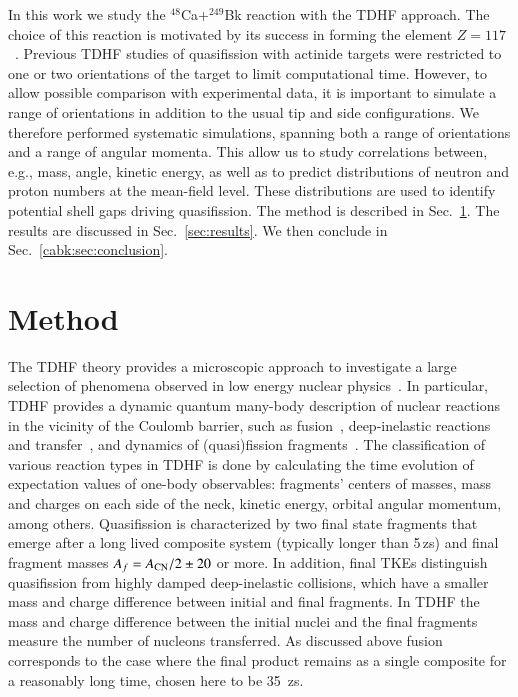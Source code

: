 In this work we study the $^{48}$Ca+$^{249}$Bk reaction with the TDHF approach.
The choice of this reaction is motivated by its success in
forming the element $Z=117$~\citep{oganessian2010,oganessian2011,oganessian2012,oganessian2013,khuyagbaatar2014}.
Previous TDHF studies of quasifission with actinide targets were restricted to one or two orientations of the target to limit computational time.
However, to allow possible comparison with experimental data, it is important to simulate a range of orientations in addition to the usual tip and side configurations.
We therefore performed systematic simulations, spanning both a range of orientations and a range of angular momenta.
This allow us to study correlations between, e.g.,  mass, angle, kinetic energy, as well as to predict distributions of neutron and proton numbers at the mean-field level.
These distributions are used to identify potential shell gaps driving quasifission.
The method is described in Sec.~\ref{sec:method}.
The results are discussed in Sec.~\ref{sec:results}.
We then conclude in Sec.~\ref{cabk:sec:conclusion}.


\section{Method}\label{sec:method}

The TDHF theory provides a microscopic approach to investigate
a large selection of phenomena
observed in low energy nuclear physics~\citep{negele1982,simenel2012,simenel2018}.
In particular, TDHF provides a dynamic quantum many-body description of
nuclear reactions in the
vicinity of the Coulomb barrier, such as fusion~\citep{bonche1978,flocard1978,simenel2001,umar2008a,umar2006d,
	washiyama2008,umar2010a,guo2012,keser2012,simenel2013a,oberacker2012,oberacker2010,umar2012a,simenel2013b,umar2014a,jiang2014},
deep-inelastic reactions and transfer~\citep{koonin1977,simenel2010,simenel2011,umar2008a,
	sekizawa2013,scamps2013a,sekizawa2014,bourgin2016,umar2017,sekizawa2019},
and dynamics of (quasi)fission fragments~\citep{umar2010a,wakhle2014,oberacker2014,simenel2014a,
	umar2015a,umar2015c,scamps2015a,goddard2015,bulgac2016,sekizawa2016,umar2016}.
The classification of various reaction types in TDHF is done by calculating the
time evolution of expectation values of one-body observables:
fragments' centers of masses, mass and charges on each side of the neck, kinetic energy,
orbital angular momentum, among others. Quasifission is characterized by two final
state fragments that emerge after a long lived composite system (typically longer
than 5\,zs) and final fragment masses $A_{f} = A_{\rm CN}/2 \pm 20$ or more. In
addition, final TKEs distinguish quasifission from highly damped deep-inelastic
collisions, which have a smaller mass and charge difference between initial and
final fragments. In TDHF the mass and charge difference between the initial nuclei
and the final fragments measure the number of nucleons transferred. As discussed
above fusion corresponds to the case where the final product remains as a single composite
for a reasonably long time, chosen here to be 35~zs.

